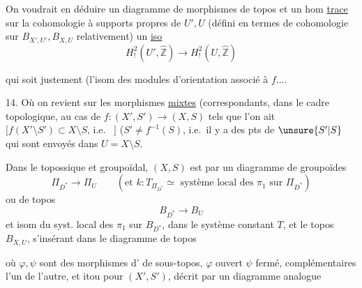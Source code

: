 On voudrait en déduire un diagramme de morphismes de topos
et un hom \uline{trace} sur la cohomologie à supports propres de $U',U$ (défini en termes de cohomologie sur $B_{X',U'}, B_{X,U}$ relativement)
   un \uline{iso}
\[
H^2_!(U',\widehat{\mathbb Z})\longrightarrow
H^2_!(U,\widehat{\mathbb Z})
\]

qui soit justement  (l'isom des modules d'orientation associé à $f$....

14. Où on revient sur les morphismes \uline{mixtes} (correspondants, dans le cadre topologique, au cas de
$f:(X',S')\longrightarrow(X,S)$ tels que l'on ait
$[f(X'\setminus S')\subset X\setminus S$, i.e.\  $]$
 ($S'\ne f^{-1}(S)$, i.e.\ il y a des pts de $\unsure{S'|S}$ qui sont envoyés dans $U=X\setminus S$.

Dans le   topossique et groupoïdal, $(X,S)$ est   par un diagramme de groupoïdes
\[
\Pi_{D^*}\longrightarrow\Pi_U
\qquad
(\text{et }k:T_{\Pi_{D^*}}\simeq
\text{ système local des }\pi_1\text{ sur }\Pi_{D^*})
\]
ou de topos
\[
B_{D^*}\longrightarrow B_U
\]
et  isom  du syst. local des $\pi_1$ sur $B_{D^*}$, dans le système  constant $T$,
et le topos $B_{X,U}$, s'insérant dans le diagramme  de topos

où $\varphi,\psi$ sont des morphismes d' de sous-topos, $\varphi$ ouvert $\psi$ fermé, complémentaires l'un de l'autre, et itou pour $(X',S')$, décrit par un diagramme analogue

